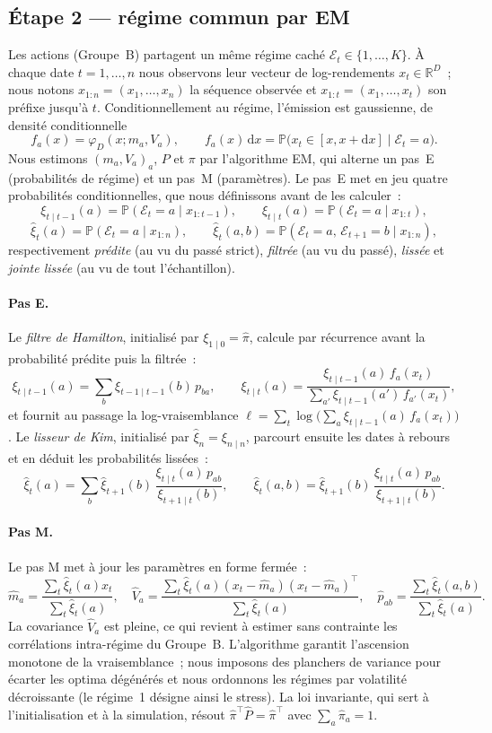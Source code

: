 \documentclass[11pt,a4paper]{article}
\theoremstyle{definition}
\newcommand{\R}{\mathbb{R}}
\newcommand{\Prob}{\mathbb{P}}
\newcommand{\Ecal}{\mathcal{E}}
\newcommand{\transp}{^{\!\top}}
\newcommand{\dd}{\mathrm{d}}
\begin{document}
\subsection{Étape 2 --- régime commun par EM}
Les actions (Groupe~B) partagent un même régime caché $\Ecal_t\in\{1,\dots,K\}$. À chaque date $t=1,\dots,n$ nous observons leur vecteur de log-rendements $x_t\in\R^{D}$~; nous notons $x_{1:n}=(x_1,\dots,x_n)$ la séquence observée et $x_{1:t}=(x_1,\dots,x_t)$ son préfixe jusqu'à $t$. Conditionnellement au régime, l'émission est gaussienne, de densité conditionnelle
\[
f_a(x)=\varphi_D(x;m_a,V_a),\qquad f_a(x)\,\dd x=\Prob\!\big(x_t\in[x,x+\dd x]\mid\Ecal_t=a\big).
\]
Nous estimons $(m_a,V_a)_{a}$, $P$ et $\pi$ par l'algorithme EM, qui alterne un pas~E (probabilités de régime) et un pas~M (paramètres). Le pas~E met en jeu quatre probabilités conditionnelles, que nous définissons avant de les calculer~:
\[
\xi_{t\mid t-1}(a)=\Prob(\Ecal_t=a\mid x_{1:t-1}),\qquad
\xi_{t\mid t}(a)=\Prob(\Ecal_t=a\mid x_{1:t}),
\]
\[
\hat\xi_t(a)=\Prob(\Ecal_t=a\mid x_{1:n}),\qquad
\hat\xi_t(a,b)=\Prob(\Ecal_t=a,\,\Ecal_{t+1}=b\mid x_{1:n}),
\]
respectivement \emph{prédite} (au vu du passé strict), \emph{filtrée} (au vu du passé), \emph{lissée} et \emph{jointe lissée} (au vu de tout l'échantillon).

\paragraph{Pas E.} Le \emph{filtre de Hamilton}, initialisé par $\xi_{1\mid0}=\hat\pi$, calcule par récurrence avant la probabilité prédite puis la filtrée~:
\[
\xi_{t\mid t-1}(a)=\sum_b\xi_{t-1\mid t-1}(b)\,p_{ba},\qquad
\xi_{t\mid t}(a)=\frac{\xi_{t\mid t-1}(a)\,f_a(x_t)}{\sum_{a'}\xi_{t\mid t-1}(a')\,f_{a'}(x_t)},
\]
et fournit au passage la log-vraisemblance $\ell=\sum_t\log\!\big(\sum_a\xi_{t\mid t-1}(a)\,f_a(x_t)\big)$. Le \emph{lisseur de Kim}, initialisé par $\hat\xi_n=\xi_{n\mid n}$, parcourt ensuite les dates à rebours et en déduit les probabilités lissées~:
\[
\hat\xi_t(a)=\sum_b\hat\xi_{t+1}(b)\,\frac{\xi_{t\mid t}(a)\,p_{ab}}{\xi_{t+1\mid t}(b)},\qquad
\hat\xi_t(a,b)=\hat\xi_{t+1}(b)\,\frac{\xi_{t\mid t}(a)\,p_{ab}}{\xi_{t+1\mid t}(b)}.
\]

\paragraph{Pas M.} Le pas M met à jour les paramètres en forme fermée~:
\[
\hat m_a=\frac{\sum_t\hat\xi_t(a)x_t}{\sum_t\hat\xi_t(a)},\quad
\hat V_a=\frac{\sum_t\hat\xi_t(a)(x_t-\hat m_a)(x_t-\hat m_a)\transp}{\sum_t\hat\xi_t(a)},\quad
\hat p_{ab}=\frac{\sum_t\hat\xi_t(a,b)}{\sum_t\hat\xi_t(a)} .
\]
La covariance $\hat V_a$ est pleine, ce qui revient à estimer sans contrainte les corrélations intra-régime du Groupe~B. L'algorithme garantit l'ascension monotone de la vraisemblance~; nous imposons des planchers de variance pour écarter les optima dégénérés et nous ordonnons les régimes par volatilité décroissante (le régime~1 désigne ainsi le stress). La loi invariante, qui sert à l'initialisation et à la simulation, résout $\hat\pi\transp\hat P=\hat\pi\transp$ avec $\sum_a\hat\pi_a=1$.
\end{document}
